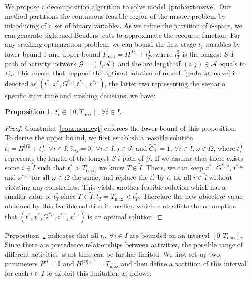 \documentclass[11pt]{article}
\newtheorem{proposition}[theorem]{Proposition}
\newcommand{\noi}{\noindent}
\begin{document}
	\newline
	We propose a decomposition algorithm to solve model~\eqref{prob:extensive}. Our method partitions the continuous feasible region of the master problem by introducing of a set of binary variables. As we refine the partition of \(t\)-space, we can generate tightened Benders' cuts to approximate the recourse function. For any crashing optimization problem, we can bound the first stage \(t_i\) variables by lower bound \(0\) and upper bound \(T_{\max} = H^{|\Omega|} + t_T^0\), where \(t_T^0\) is the longest \(S\)-\(T\) path of activity network \(\mathcal{G} = (I,\mathcal{A})\) and the arc length of \((i,j) \in \mathcal{A}\) equals to \(D_i\). This means that suppose the optimal solution of model~\eqref{prob:extensive} is denoted as \((t^*,x^*,G^{*,\cdot},t^{*,\cdot},x^{*,\cdot})\), the latter two representing the scenario specific start time and crashing decisions, we have:
	\begin{proposition} \label{prop:bounds}
		 \(t^*_i \in [0,T_{\max}],\ \forall i \in I\).
	\end{proposition}
	\begin{proof}
		Constraint~\eqref{cons:nonnegt} enforces the lower bound of this proposition. \\
		\newline 
		To derive the upper bound, 
		we first establish a feasible solution \(\tilde{t}_i = H^{|\Omega|} + t^0_i,\ \forall i \in I\), \(\tilde{x}_{ij} = 0,\ \forall i \in I, j \in J_i\) and \(\tilde{G}_i^\omega = 1,\ \forall i \in I, \omega \in \Omega\), where \(t^0_i\) represents the length of the longest \(S\)-\(i\) path of \(\mathcal{G}\). 
		If we assume that there exists some \(i \in \tilde{I}\) such that \(t_i^* > T_{\max}\), we know \(T \in \tilde{I}\). There, we can keep \(x^*\), \(G^{*,\omega}\), \(t^{*,\omega}\) and \(x^{*,\omega}\) for all \(\omega \in \Omega\) the same, and replace the \(t_i^*\) by \(\tilde{t}_i\) for all \(i \in \tilde{I}\) without violating any constraints. This yields another feasible solution which has a smaller value of \(t_T^*\) since \(T \in \tilde{I}, \tilde{t}_T = T_{\max} < t_T^*\). Therefore the new objective value obtained by this feasible solution is smaller, which contradicts the assumption that \((t^*,x^*,G^{*,\cdot},t^{*,\cdot},x^{*,\cdot})\) is an optimal solution.
	\end{proof}
	\noi Proposition~\ref{prop:bounds} indicates that all \(t_i,\ \forall i \in I\) are bounded on an interval \([0,T_{\max}]\). Since there are precedence relationships between activities, the possible range of different activities' start time can be further limited. We first set up two parameters \(H^0 = 0\) and \(H^{|\Omega| + 1} = T_{\max}\) and then define a partition of this interval for each \(i \in I\) to exploit this limitation as follows:
\end{document}
